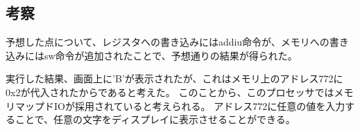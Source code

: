\subsection{考察}
予想した点について、レジスタへの書き込みにはaddiu命令が、メモリへの書き込みにはsw命令が追加されたことで、予想通りの結果が得られた。

実行した結果、画面上に'B'が表示されたが、これはメモリ上のアドレス772に0x2が代入されたからであると考えた。
このことから、このプロセッサではメモリマップドIOが採用されていると考えられる。
アドレス772に任意の値を入力することで、任意の文字をディスプレイに表示させることができる。
